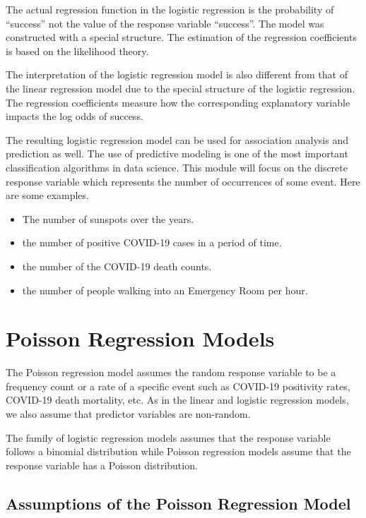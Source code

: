 \documentclass[
]{book}
\providecommand{\tightlist}{%
  \setlength{\itemsep}{0pt}\setlength{\parskip}{0pt}}
\begin{document}
The actual regression function in the logistic regression is the probability of ``success'' not the value of the response variable ``success''. The model was constructed with a special structure. The estimation of the regression coefficients is based on the likelihood theory.

The interpretation of the logistic regression model is also different from that of the linear regression model due to the special structure of the logistic regression. The regression coefficients measure how the corresponding explanatory variable impacts the log odds of success.

The resulting logistic regression model can be used for association analysis and prediction as well. The use of predictive modeling is one of the most important classification algorithms in data science. This module will focus on the discrete response variable which represents the number of occurrences of some event. Here are some examples.

\begin{itemize}
\tightlist
\item
  The number of sunspots over the years.
\item
  the number of positive COVID-19 cases in a period of time.
\item
  the number of the COVID-19 death counts.
\item
  the number of people walking into an Emergency Room per hour.
\end{itemize}

\hypertarget{poisson-regression-models}{%
\section{Poisson Regression Models}\label{poisson-regression-models}}

The Poisson regression model assumes the random response variable to be a frequency count or a rate of a specific event such as COVID-19 positivity rates, COVID-19 death mortality, etc. As in the linear and logistic regression models, we also assume that predictor variables are non-random.

The family of logistic regression models assumes that the response variable follows a binomial distribution while Poisson regression models assume that the response variable has a Poisson distribution.

\hypertarget{assumptions-of-the-poisson-regression-model}{%
\subsection{Assumptions of the Poisson Regression Model}\label{assumptions-of-the-poisson-regression-model}}
\end{document}
